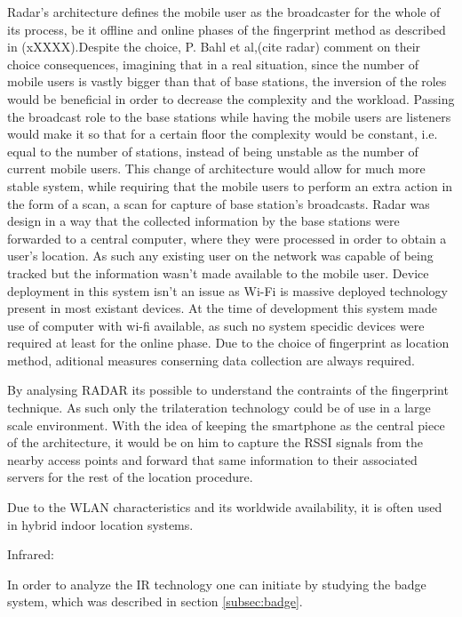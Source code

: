 	Radar's architecture defines the mobile user as the broadcaster for the whole of its process, be it offline and online phases of the fingerprint method as described in (xXXXX).Despite the choice, P. Bahl et al,(cite radar) comment on their choice consequences, imagining that in a real situation, since the number of mobile users is vastly bigger than that of base stations, the inversion of the roles would be beneficial in order to decrease the complexity and the workload. Passing the broadcast role to the base stations while having the mobile users are listeners would make it so that for a certain floor the complexity would be constant, i.e. equal to the number of stations, instead of being unstable as the number of current mobile users. This change of architecture would allow for much more stable system, while requiring that the mobile users to perform an extra action in the form of a scan, a scan for capture of base station's broadcasts. Radar was design in a way that the collected information by the base stations were forwarded to a central computer, where they were processed in order to obtain a user's location. As such any existing user on the network was capable of being tracked but the information wasn't made available to the mobile user. Device deployment in this system isn't an issue as Wi-Fi is massive deployed technology present in most existant devices. At the time of development this system made use of computer with wi-fi available, as such no system specidic devices were required at least for the online phase. Due to the choice of fingerprint as location method, aditional measures conserning data collection are always required.

	By analysing RADAR its possible to understand the contraints of the fingerprint technique. As such only the trilateration technology could be of use in a large scale environment. With the idea of keeping the smartphone as the central piece of the  architecture, it would be on him to capture the \ac{RSSI} signals from the nearby access points and forward that same information to their associated servers for the rest of the location procedure.


	Due to the WLAN characteristics and its worldwide availability, it is often used in hybrid indoor location systems. 



Infrared: 

	In order to analyze the \acf{IR} technology one can initiate by studying the badge system, which was described in section \ref{subsec:badge}.

